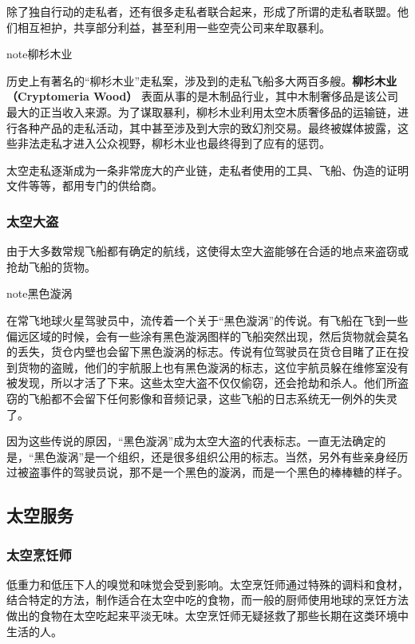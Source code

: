 \documentclass[letterpaper,10pt]{sphinxmanual}
\begin{document}
除了独自行动的走私者，还有很多走私者联合起来，形成了所谓的走私者联盟。他们相互袒护，共享部分利益，甚至利用一些空壳公司来牟取暴利。

\begin{notice}{note}{柳杉木业}

历史上有著名的“柳杉木业”走私案，涉及到的走私飞船多大两百多艘。\textbf{柳杉木业（Cryptomeria Wood）} 表面从事的是木制品行业，其中木制奢侈品是该公司最大的正当收入来源。为了谋取暴利，柳杉木业利用太空木质奢侈品的运输链，进行各种产品的走私活动，其中甚至涉及到大宗的致幻剂交易。最终被媒体披露，这些非法走私才进入公众视野，柳杉木业也最终得到了应有的惩罚。
\end{notice}

太空走私逐渐成为一条非常庞大的产业链，走私者使用的工具、飞船、伪造的证明文件等等，都用专门的供给商。


\subsubsection{太空大盗}
\label{profession:id31}
由于大多数常规飞船都有确定的航线，这使得太空大盗能够在合适的地点来盗窃或抢劫飞船的货物。

\begin{notice}{note}{黑色漩涡}

在常飞地球火星驾驶员中，流传着一个关于“黑色漩涡”的传说。有飞船在飞到一些偏远区域的时候，会有一些涂有黑色漩涡图样的飞船突然出现，然后货物就会莫名的丢失，货仓内壁也会留下黑色漩涡的标志。传说有位驾驶员在货仓目睹了正在投到货物的盗贼，他们的宇航服上也有黑色漩涡的标志，这位宇航员躲在维修室没有被发现，所以才活了下来。这些太空大盗不仅仅偷窃，还会抢劫和杀人。他们所盗窃的飞船都不会留下任何影像和音频记录，这些飞船的日志系统无一例外的失灵了。

因为这些传说的原因，“黑色漩涡”成为太空大盗的代表标志。一直无法确定的是，“黑色漩涡”是一个组织，还是很多组织公用的标志。当然，另外有些亲身经历过被盗事件的驾驶员说，那不是一个黑色的漩涡，而是一个黑色的棒棒糖的样子。
\end{notice}


\subsection{太空服务}
\label{profession:id32}

\subsubsection{太空烹饪师}
\label{profession:id33}
低重力和低压下人的嗅觉和味觉会受到影响。太空烹饪师通过特殊的调料和食材，结合特定的方法，制作适合在太空中吃的食物，而一般的厨师使用地球的烹饪方法做出的食物在太空吃起来平淡无味。太空烹饪师无疑拯救了那些长期在这类环境中生活的人。
\end{document}

